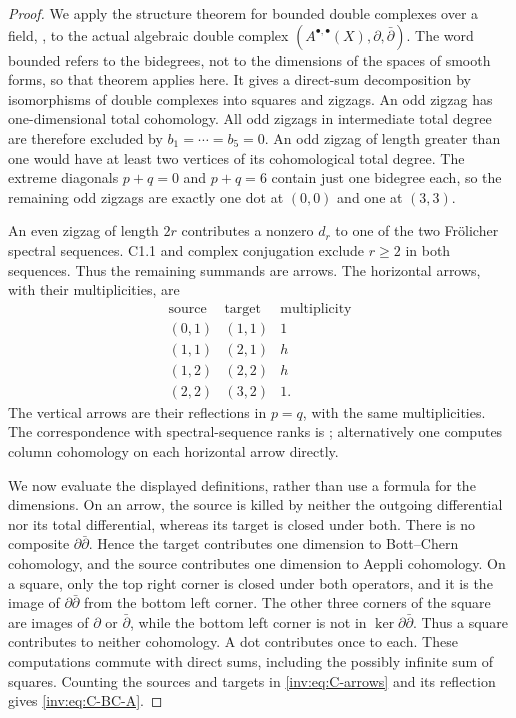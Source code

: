 \begin{proof}
We apply the structure theorem for bounded double complexes over a
field, \citet[Theorem 3]{Stelzig2021}, to the actual algebraic double
complex $(A^{\bullet,\bullet}(X),\partial,\bar\partial)$.
The word bounded refers to the bidegrees, not to the dimensions of the
spaces of smooth forms, so that theorem applies here.  It gives a
direct-sum decomposition by isomorphisms of double complexes into
squares and zigzags.  An odd zigzag has one-dimensional total
cohomology.  All odd zigzags in intermediate total degree are therefore
excluded by $b_1=\cdots=b_5=0$.  An odd zigzag of length greater than
one would have at least two vertices of its cohomological total degree.
The extreme diagonals $p+q=0$ and $p+q=6$ contain just one bidegree
each, so the remaining odd zigzags are exactly one dot at $(0,0)$ and
one at $(3,3)$.

An even zigzag of length $2r$ contributes a nonzero $d_r$ to one of
the two Fr\"olicher spectral sequences.  C1.1 and complex conjugation
exclude $r\ge2$ in both sequences.  Thus the remaining summands are
arrows.  The horizontal arrows, with their multiplicities, are
\begin{equation}\label{inv:eq:C-arrows}
\begin{array}{c|c|r}
\text{source}&\text{target}&\text{multiplicity}\\\hline
(0,1)&(1,1)&1\\
(1,1)&(2,1)&h\\
(1,2)&(2,2)&h\\
(2,2)&(3,2)&1.
\end{array}
\end{equation}
The vertical arrows are their reflections in $p=q$, with the same
multiplicities.  The correspondence with spectral-sequence ranks is
\citet[Proposition 6(1)]{Stelzig2021}; alternatively one computes
column cohomology on each horizontal arrow directly.

We now evaluate the displayed definitions, rather than use a formula
for the dimensions.  On an arrow, the source is killed by neither
the outgoing differential nor its total differential, whereas its
target is closed under both.  There is no composite
$\partial\bar\partial$.  Hence the target contributes one dimension
to Bott--Chern cohomology, and the source contributes one dimension
to Aeppli cohomology.  On a square, only the top right corner is closed
under both operators, and it is the image of
$\partial\bar\partial$ from the bottom left corner.  The other
three corners of the square are images of $\partial$ or
$\bar\partial$, while the bottom left corner is not in
$\ker\partial\bar\partial$.  Thus a square contributes to neither
cohomology.  A dot contributes once to each.  These computations
commute with direct sums, including the possibly infinite sum of
squares.  Counting the sources and targets in \eqref{inv:eq:C-arrows}
and its reflection gives \eqref{inv:eq:C-BC-A}.


\end{proof}
